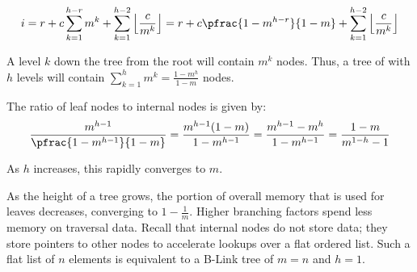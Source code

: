 
$$
	i = r + c\sum_{k=1}^{h-r} m^k
		+ \sum_{k=1}^{h-2} \left\lfloor\frac{c}{m^k}\right\rfloor
	= r + c\pfrac{1 - m^{h-r}}{1 - m}
		+ \sum_{k=1}^{h-2} \left\lfloor\frac{c}{m^k}\right\rfloor
$$

\begin{figure}[H]
	\centering
\end{figure}



A level $k$ down the tree from the root will contain $m^k$ nodes.
Thus, a tree of with $h$ levels will contain
$\sum_{k=1}^h m^k = \frac{1-m^h}{1-m}$ nodes.

The ratio of leaf nodes to internal nodes is given by:
$$
	\frac{m^{h-1}}{\pfrac{1-m^{h-1}}{1-m}}
	= \frac{m^{h-1}(1-m)}{1-m^{h-1}}
	= \frac{m^{h-1}-m^{h}}{1-m^{h-1}}
	= \frac{1-m}{m^{1-h} - 1}
$$

As $h$ increases, this rapidly converges to $m$.

\begin{figure}[H]
\end{figure}

As the height of a tree grows, the portion of overall memory that is used for
leaves decreases, converging to $1-\frac{1}{m}$. Higher branching factors spend
less memory on traversal data. Recall that internal nodes do not store data;
they store pointers to other nodes to accelerate lookups over a flat ordered
list. Such a flat list of $n$ elements is equivalent to a B-Link tree of $m=n$
and $h=1$.


